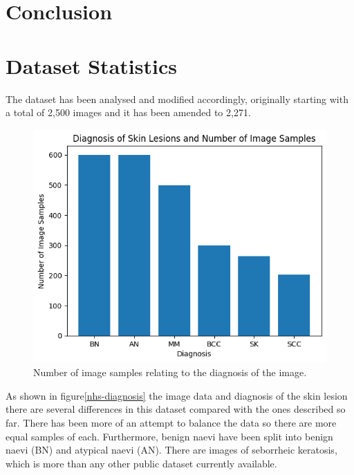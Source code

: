 \section{Conclusion}



\section{Dataset Statistics}
The dataset has been analysed and modified accordingly, originally starting with a total of 2,500 images and it has been amended to 2,271.

\begin{figure}
    \centering
    \includegraphics[scale=0.75]{images/nhs/nhs-diagnosis.png}
    \caption{Number of image samples relating to the diagnosis of the image.} 
\end{figure}\label{nhs-diagnosis}

 As shown in figure\ref{nhs-diagnosis} the image data and diagnosis of the skin lesion there are several differences in this dataset compared with the ones described so far. There has been more of an attempt to balance the data so there are more equal samples of each. Furthermore, benign naevi have been split into benign naevi (BN) and atypical naevi (AN). There are images of seborrheic keratosis, which is more than any other public dataset currently available. 


